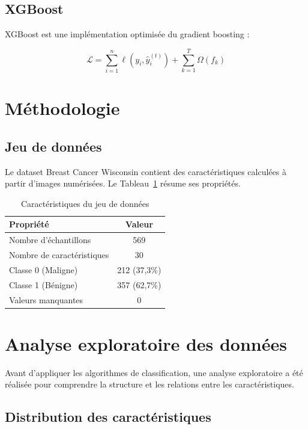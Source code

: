 \documentclass[conference]{IEEEtran}
\begin{document}
\subsection{XGBoost}

XGBoost est une implémentation optimisée du gradient boosting \cite{chen2016} :

\begin{equation}
\mathcal{L} = \sum_{i=1}^{n} \ell(y_i, \hat{y}_i^{(t)}) + \sum_{k=1}^{T} \Omega(f_k)
\end{equation}

\section{Méthodologie}

\subsection{Jeu de données}

Le dataset Breast Cancer Wisconsin \cite{wolberg1995} contient des caractéristiques calculées à partir d'images numérisées. Le Tableau~\ref{tab:dataset} résume ses propriétés.

\begin{table}[H]
\centering
\caption{Caractéristiques du jeu de données}
\label{tab:dataset}
\begin{tabular}{l|c}
\toprule
Propriété & Valeur \\
\midrule
Nombre d'échantillons & 569 \\
Nombre de caractéristiques & 30 \\
Classe 0 (Maligne) & 212 (37,3\%) \\
Classe 1 (Bénigne) & 357 (62,7\%) \\
Valeurs manquantes & 0 \\
\bottomrule
\end{tabular}
\end{table}

\section{Analyse exploratoire des données}

Avant d'appliquer les algorithmes de classification, une analyse exploratoire a été réalisée pour comprendre la structure et les relations entre les caractéristiques.

\subsection{Distribution des caractéristiques}
\end{document}
